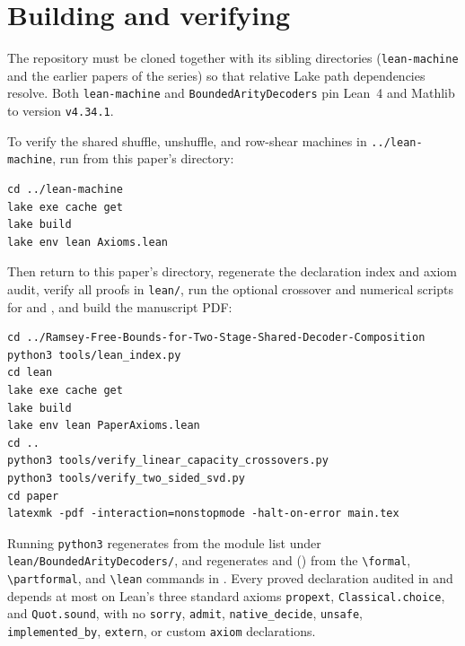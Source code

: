 \section{Building and verifying}\label{sec:verification}

The repository must be cloned together with its sibling directories (\texttt{lean-machine} and the
earlier papers of the series) so that relative Lake path dependencies resolve. Both
\texttt{lean-machine} and \texttt{BoundedArityDecoders} pin Lean~4 and Mathlib to version
\texttt{v4.34.1}.

To verify the shared shuffle, unshuffle, and row-shear machines in \texttt{../lean-machine}, run from
this paper's directory:
\begin{verbatim}
cd ../lean-machine
lake exe cache get
lake build
lake env lean Axioms.lean
\end{verbatim}
Then return to this paper's directory, regenerate the declaration index and axiom audit, verify all
proofs in \texttt{lean/}, run the optional crossover and numerical scripts for
 and , and
build the manuscript PDF:
\begin{verbatim}
cd ../Ramsey-Free-Bounds-for-Two-Stage-Shared-Decoder-Composition
python3 tools/lean_index.py
cd lean
lake exe cache get
lake build
lake env lean PaperAxioms.lean
cd ..
python3 tools/verify_linear_capacity_crossovers.py
python3 tools/verify_two_sided_svd.py
cd paper
latexmk -pdf -interaction=nonstopmode -halt-on-error main.tex
\end{verbatim}
Running \texttt{python3}  regenerates
 from the module list under
\texttt{lean/BoundedArityDecoders/}, and regenerates  and
 () from the \verb|\formal|,
\verb|\partformal|, and \verb|\lean| commands in . Every proved
declaration audited in  and  depends at most on
Lean's three standard axioms \texttt{propext}, \texttt{Classical.choice}, and \texttt{Quot.sound},
with no \texttt{sorry}, \texttt{admit}, \texttt{native\_decide}, \texttt{unsafe},
\texttt{implemented\_by}, \texttt{extern}, or custom \texttt{axiom} declarations.
